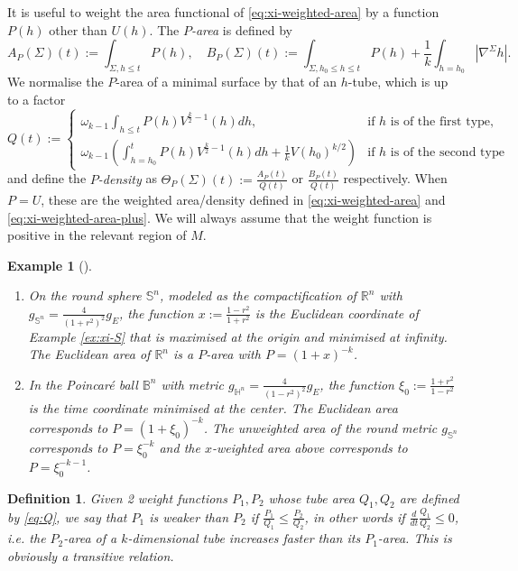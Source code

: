 \documentclass[11pt]{article}
\newtheorem{exampl}[theorem]{Example}
\newtheorem{definition}[theorem]{Definition}
\begin{document}
It is useful to weight the area functional of \eqref{eq:xi-weighted-area} by a
function \(P(h)\) other than \(U(h)\). The \emph{\(P\)-area} is defined
by 
\[ 
A_P(\Sigma)(t):= \int_{\Sigma,h\leq t}P(h), \quad B_P(\Sigma)(t):=\int_{\Sigma,h_0\leq h\leq t}P(h) +
\frac{1}{k}\int_{h=h_0}|\nabla^\Sigma h|.
\]
We normalise
the \(P\)-area of a minimal surface by that of an \(h\)-tube,
which is up to a factor
\begin{equation}
\label{eq:Q}
Q(t):=
\begin{cases}
\omega_{k-1}\int_{h\leq t} P(h)V^{\frac{k}{2}-1}(h) dh,  & \text{if $h$ is of the first type}, \\
\omega_{k-1}\left(\int_{h=h_0}^t P(h)V^{\frac{k}{2}-1}(h)dh + \frac{1}{k}V(h_0)^{k/2}\right) & \text{if $h$ is of the second type}
\end{cases}
\end{equation}
and define the \emph{\(P\)-density} as 
\(\Theta_P(\Sigma)(t):= \frac{A_P(t)}{Q(t)}\) or \(\frac{B_P(t)}{Q(t)}\)
respectively. When \(P=U\), these are the weighted area/density defined in
\eqref{eq:xi-weighted-area} and \eqref{eq:xi-weighted-area-plus}. We will always assume that the weight function is positive in the relevant
region of \(M\). 
\begin{exampl}[]
\label{ex:weight-P}
\begin{enumerate}
\item On the round sphere \(\mathbb{S}^n\), modeled as the compactification of \(\mathbb{R}^n\)
with \(g_{\mathbb{S}^n}= \frac{4}{(1+r^2)^2}g_E\), the function \(x:=
   \frac{1-r^2}{1+r^2}\) is the Euclidean
coordinate of Example \ref{ex:xi-S} that is maximised at the origin and minimised at 
infinity. The Euclidean area of \(\mathbb{R}^n\) is a \(P\)-area with \(P = (1+x)^{-k}\).
\item In the Poincaré ball \(\mathbb{B}^n\) with metric \(g_{\mathbb{H}^n}=
   \frac{4}{(1-r^2)^2}g_E\), the function \(\xi_0 := \frac{1+r^2}{1-r^2}\) is the time
coordinate minimised at the center. The Euclidean area corresponds to \(P = (1+\xi_0)^{-k}\). 
The unweighted area of the round metric \(g_{\mathbb{S}^n}\) corresponds to \(P=\xi_0^{-k}\) and the \(x\)-weighted area above
corresponds to \(P = \xi_0^{-k-1}\).
\end{enumerate}
\end{exampl}

\begin{definition}
Given 2 weight functions \(P_1, P_2\) whose tube area \(Q_1, Q_2\) are defined by
\eqref{eq:Q}, we say that \(P_1\) is \emph{weaker} than \(P_2\) if \(\frac{P_1}{Q_1}\leq \frac{P_2}{Q_2}\), in other words if \(\frac{d}{dt}\frac{Q_1}{Q_2}\leq 0\), i.e. the \(P_2\)-area 
of a \(k\)-dimensional tube increases faster than its \(P_1\)-area. This is obviously
a transitive relation.
\end{definition}
\end{document}
